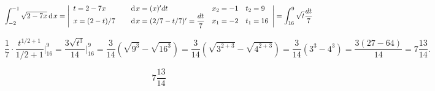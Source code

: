 {}

$$
  \int^{-1}_{-2} \sqrt{2-7x}\hspace{2pt}\text{d}\hspace{1pt}{x} = \Bigg |
    \begin{array}{l c l l l }
      t = 2-7x           & & \hspace{2pt}\text{d}\hspace{1pt}{x} = (x)'dt  & x_2 = -1 & t_2 = 9 \\
      x = (2-t)/7 & & \hspace{2pt}\text{d}\hspace{1pt}{x} = (2/7 - t/7)' = \dfrac{dt}{7} & x_1 = -2 & t_1 = 16 \\
    \end{array}
  \Bigg | =
  \int^{9}_{16} \sqrt{t} \dfrac{dt}{7}
$$

$$
  \dfrac{1}{7} \cdot \dfrac{t^{1/2+1}}{1/2+1} \Bigg |^9_{16} =
  \dfrac{3\sqrt{t^3}}{14} \Bigg |^9_{16} = \dfrac{3}{14} ( \sqrt{9^3} - \sqrt{16^3} ) =
  \dfrac{3}{14} ( \sqrt{3^{2+3}} - \sqrt{4^{2+3}} ) =
  \dfrac{3}{14} ( 3^3 - 4^3 ) = \dfrac{3(27-64)}{14} = 7 \dfrac{13}{14}.
$$

$$
\boxed{7 \dfrac{13}{14}}
$$
